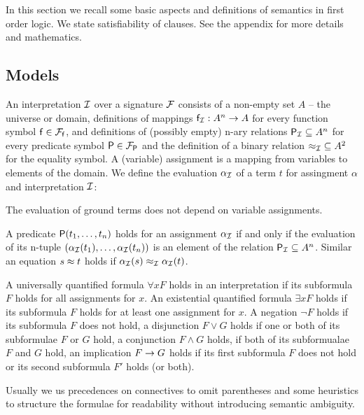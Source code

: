 In this section we recall some basic aspects and definitions of semantics in first order logic. 
We state satisfiability of clauses. See the appendix for more details and mathematics.

\subsection{Models}

\begin{definition}\label{def:interpretation}
	An {\myem interpretation} ${\mathcal I}$ over a signature ${\mathcal F}$ consists of a
	non-empty set $A$ -- the {\myem universe} or {\myem domain},
	definitions of mappings ${\mathsf f}_{\mathcal I}: A^n\rightarrow A$ for every function symbol ${\mathsf f}\in{{\mathcal F}_{\mathsf f}}$, 
	and definitions of (possibly empty) n-ary relations 
	 ${{\mathsf P}_{\mathcal I}}\subseteq A^n$ for every predicate symbol ${\mathsf P}\in{{\mathcal F}_{\mathsf P}}$
	 and the definition of a binary relation ${\approx_{\mathcal I}}\subseteq A^2$ for the equality symbol.
	 A (variable) {\myem assignment} is a mapping from variables to elements of the domain.
	 We define the {\myem evaluation} $\alpha_{\mathcal I}$ of a term $t$ 
	 for assingment $\alpha$ and interpretation ${\mathcal I}$:
\begin{remark}
	The evaluation of ground terms does not depend on variable assignments.
\end{remark}
\end{definition}

\begin{definition}\label{def:semantics:atoms}
	A predicate ${\mathsf P}(t_1,\ldots,t_n)$ 
	{\myem holds} for an assignment $\alpha_{\mathcal I}$ 
	if and only if the evaluation of its n-tuple $
	(\alpha_{\mathcal I}({t_1}),\ldots,\alpha_{\mathcal I}({t_n}))$
	is an element of the relation ${\mathsf P}_{\mathcal I}\subseteq A^n$.
	Similar an equation $s\approx t$ 
	holds if $\alpha_{\mathcal I}(s) \approx_{\mathcal I} \alpha_{\mathcal I}(t)$.
\end{definition}

\begin{definition}\label{def:semantics:FOF}
	A universally quantified formula $\forall x F$ holds in an interpretation if its subformula $F$ holds for all assignments for $x$.
	An existential quantified formula $\exists xF$ holds if its subformula $F$ holds for at least one assignment for $x$.
	A negation $\lnot F$ holds if its subformula $F$ does not hold, 
	a disjunction $F\lor G$ holds if one or both of its subformulae $F$ or $G$ hold,
	a conjunction $F\land G$ holds, if both of its subformualae $F$ and $G$ hold, 
	an implication $F\rightarrow G$ holds if its first subformula $F$ does not hold or its second subformula $F'$ holds (or both).
	\begin{remark}Usually we us precedences on connectives to omit parentheses 
		and some heuristics to structure the formulae for readability 
		without introducing semantic ambiguity.
	\end{remark}
\end{definition}

